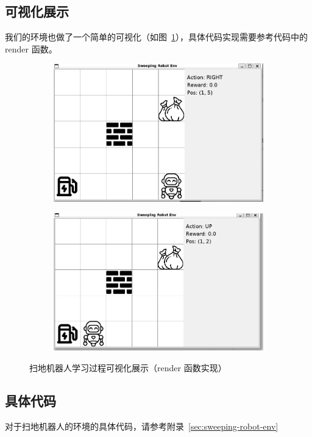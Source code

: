 \subsection{可视化展示}

我们的环境也做了一个简单的可视化（如图~\ref{fig:sweeping-robot-env-render}），具体代码实现需要参考代码中的 \textsf{render} 函数。


\begin{figure}[htb]
\centering
\begin{subfigure}{0.48\linewidth}
    \centering
    \includegraphics[width=\linewidth]{figure/sweep_robot_env_render1.jpg}
\end{subfigure}
\hfill
\begin{subfigure}{0.48\linewidth}
    \centering
    \includegraphics[width=\linewidth]{figure/sweep_robot_env_render2.jpg}
\end{subfigure}
\caption{扫地机器人学习过程可视化展示（\textsf{render} 函数实现）}
\label{fig:sweeping-robot-env-render}
\end{figure}

\subsection{具体代码}

对于扫地机器人的环境的具体代码，请参考附录~\ref{sec:sweeping-robot-env}
